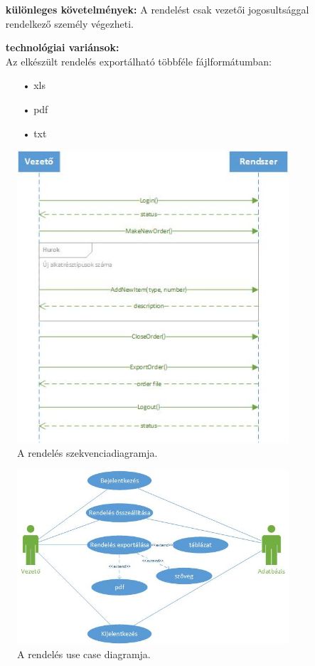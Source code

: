 \documentclass[12pt]{article}\usepackage[left=20mm,right=20mm,top=15mm,bottom=20mm]{geometry}
\begin{document}
\begin{itemize}
\item[] \textbf{különleges követelmények: } A rendelést csak vezetői jogosultsággal rendelkező személy végezheti.

\item[] \textbf{technológiai variánsok: } \\Az elkészült rendelés exportálható többféle fájlformátumban:
\vspace*{-3mm}
\begin{itemize}
\item[•] xls
\item[•] pdf
\item[•] txt
\end{itemize}
\end{itemize} 

\begin{figure}[!h]
    \centering
        \includegraphics[width=0.9\textwidth]{figures/rendeles_SD.jpg}
        \caption{A rendelés szekvenciadiagramja.}
\end{figure}

\begin{figure}[!h]
    \centering
        \includegraphics[width=0.9\textwidth]{figures/rendeles_UC.jpg}
        \caption{A rendelés use case diagramja.}
\end{figure}
\end{document}
